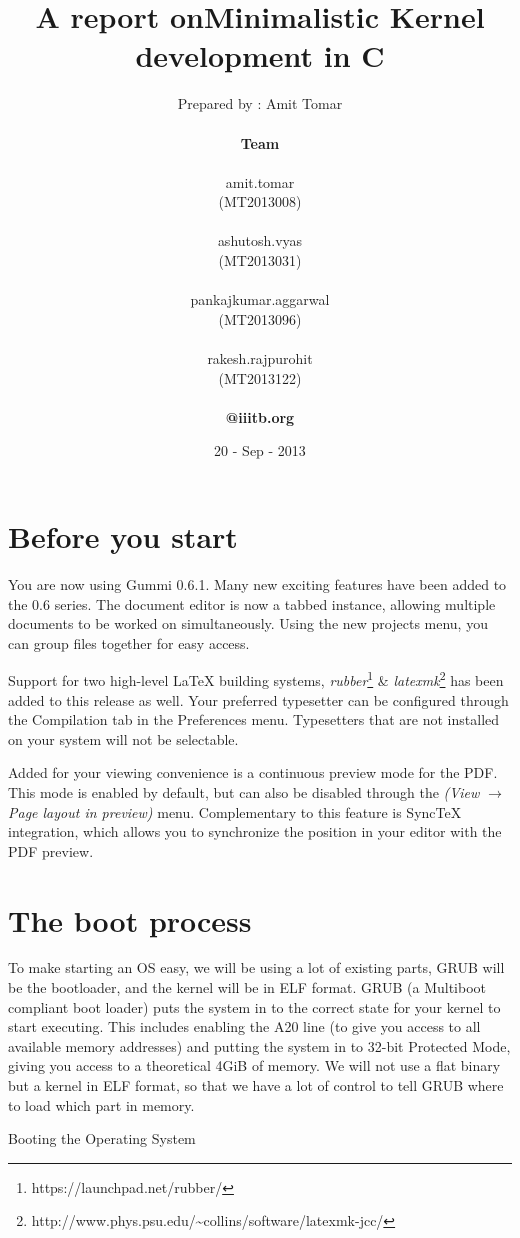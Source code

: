 \documentclass[11pt]{article}
\title{\textbf{A report on\linebreak Minimalistic Kernel development in C} }
\author{ 		
        {Prepared by : Amit Tomar}\\
        		\vspace{ 2 mm}\\		
		\textbf{Team} \\	
				\vspace{ -4 mm}\\					
		amit.tomar \\
		(MT2013008) \\
		\vspace{ -3 mm}\\		
		ashutosh.vyas\\								     
		(MT2013031) \\		
				\vspace{ -3 mm}\\					
		pankajkumar.aggarwal\\
		(MT2013096) \\
				\vspace{ -3 mm}\\		
		rakesh.rajpurohit\\
		(MT2013122) \\
						\vspace{ -2 mm}\\		
		\textbf{@iiitb.org}}
\date{20 - Sep - 2013}
\begin{document}
\maketitle



\section{Before you start}

You are now using Gummi 0.6.1. Many new exciting features have been added to the 0.6 series. The document editor is now a tabbed instance, allowing multiple documents to be worked on simultaneously. Using the new projects menu, you can group files together for easy access. 

Support for two high-level {\LaTeX} building systems, \emph{rubber}\footnote{https://launchpad.net/rubber/} \& \emph{latexmk}\footnote{http://www.phys.psu.edu/{\textasciitilde}collins/software/latexmk-jcc/} has been added to this release as well. Your preferred typesetter can be configured through the Compilation tab in the Preferences menu. Typesetters that are not installed on your system will not be selectable. 

Added for your viewing convenience is a continuous preview mode for the PDF. This mode is enabled by default, but can also be disabled through the \emph{(View $\rightarrow$ Page layout in preview)} menu. Complementary to this feature is SyncTeX integration, which allows you to synchronize the position in your editor with the PDF preview. 

\section{The boot process}

To make starting an OS easy, we will be using a lot of existing parts, GRUB will be the bootloader, and the kernel will be in ELF format. GRUB (a Multiboot compliant boot loader) puts the system in to the correct state for your kernel to start executing. This includes enabling the A20 line (to give you access to all available memory addresses) and putting the system in to 32-bit Protected Mode, giving you access to a theoretical 4GiB of memory. We will not use a flat binary but a kernel in ELF format, so that we have a lot of control to tell GRUB where to load which part in memory.

Booting the Operating System
\end{document}

